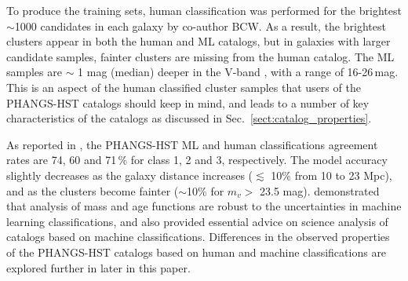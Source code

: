 \documentclass[linenumbers]{aastex63}
\begin{document}
To produce the training sets, human classification was performed for the brightest $\sim$1000 candidates 
in each galaxy by co-author BCW. %
As a result, the brightest clusters appear in both the human and ML catalogs, but in galaxies with larger candidate samples, fainter clusters are missing from the human catalog.  The ML samples are $\sim$ 1 mag (median) deeper in the V-band \citep[and Section~\ref{ssect:v_mag}]{whitmore_star_2021}, with a range of 16-26\,mag. %
This is an aspect of the human classified cluster samples that users of the PHANGS-HST catalogs should keep in mind, and leads to a number of key characteristics of the catalogs as discussed in Sec.~\ref{sect:catalog_properties}.   

As reported in \citet{hannon_star_2023}, the PHANGS-HST ML and human classifications agreement rates are 74, 60 and 71\,\% for class 1, 2 and 3, respectively.  
The model accuracy slightly decreases as the galaxy distance increases ($\lesssim$ 10\% from 10 to 23 Mpc), and as the clusters become fainter ($\sim$10\% for $m_v>$ 23.5 mag). \citet{whitmore_star_2021} demonstrated that analysis of mass and age functions are robust to the uncertainties in machine learning classifications, and also provided essential advice on science analysis of catalogs based on machine classifications.  Differences in the observed properties of the PHANGS-HST catalogs based on human and machine classifications are explored further in later in this paper.
\end{document}
